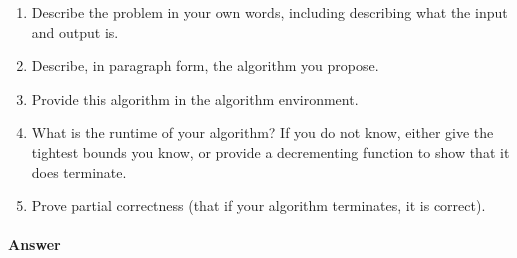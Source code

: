 \documentclass{article}
\begin{document}
\begin{enumerate}
    \item Describe the problem in your own words, including
        describing what the input and output is.
    \item Describe, in paragraph form, the algorithm you propose.
    \item Provide this algorithm in the algorithm environment.
    \item What is the runtime of your algorithm? If you do not know, either give
        the tightest bounds you know, or provide a decrementing function to show
        that it does terminate.
    \item Prove partial correctness (that if your algorithm terminates, it is
        correct).
\end{enumerate}



\paragraph{Answer}

\end{document}
